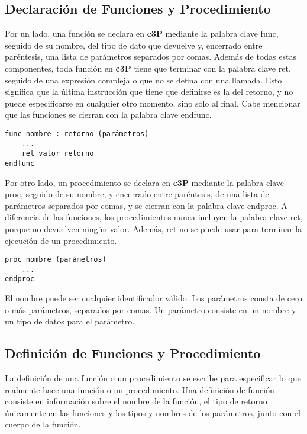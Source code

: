 \subsection{Declaración de Funciones y Procedimiento}

Por un lado, una función se declara en \textbf{c3P} mediante la palabra clave func,
seguido de su nombre, del tipo de dato que devuelve y, encerrado entre paréntesis,
una lista de parámetros separados por comas. Además de todas estas componentes,
toda función en \textbf{c3P} tiene que terminar con la palabra clave ret, seguido
de una expresión compleja o que no se defina con una llamada. Esto significa que
la última instrucción que tiene que definirse es la del retorno, y no puede
especificarse en cualquier otro momento, sino sólo al final. Cabe mencionar que
las funciones se cierran con la palabra clave endfunc.

\begin{verbatim}
func nombre : retorno (parámetros)
    ...
    ret valor_retorno
endfunc
\end{verbatim}

Por otro lado, un procedimiento se declara en \textbf{c3P} mediante la palabra clave proc,
seguido de su nombre, y encerrado entre paréntesis, de una lista de parámetros separados
por comas, y se cierran con la palabra clave endproc. A diferencia de las funciones, los
procedimientos nunca incluyen la palabra clave ret, porque no devuelven ningún valor. Además,
ret no se puede usar para terminar la ejecución de un procedimiento.

\begin{verbatim}
proc nombre (parámetros)
    ...
endproc
\end{verbatim}

El nombre puede ser cualquier identificador válido.
Los parámetros consta de cero o más parámetros, separados por comas. Un parámetro consiste en un
nombre y un tipo de datos para el parámetro.

\subsection{Definición de Funciones y Procedimiento}

La definición de una función o un procedimiento se escribe para especificar lo que realmente hace una
función o un procedimiento. Una definición de función consiste en información sobre el nombre de la función,
el tipo de retorno únicamente en las funciones y los tipos y nombres de los parámetros, junto con el cuerpo de la función.

